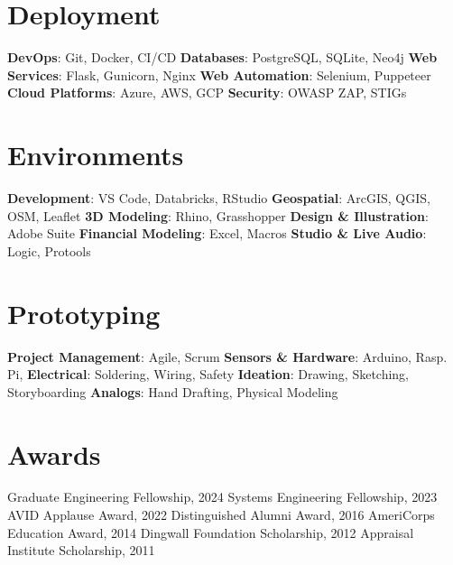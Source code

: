 \documentclass{article}
\begin{document}
\begin{bgbox}[
        height = \paperheight,
        width = 0.3\textwidth,
        colback = gray
    ]
{            \section*{Deployment}
                \textbf{DevOps}: Git, Docker, CI/CD \newline
                \textbf{Databases}: PostgreSQL, SQLite, Neo4j\newline
                \textbf{Web Services}: Flask, Gunicorn, Nginx\newline
                \textbf{Web Automation}: Selenium, Puppeteer\newline
                \textbf{Cloud Platforms}: Azure, AWS, GCP\newline
                \textbf{Security}: OWASP ZAP, STIGs
            \section*{Environments}
                \textbf{Development}: VS Code, Databricks, RStudio\newline
                \textbf{Geospatial}: ArcGIS, QGIS, OSM, Leaflet\newline
                \textbf{3D Modeling}: Rhino, Grasshopper\newline
                \textbf{Design \& Illustration}: Adobe Suite\newline
                \textbf{Financial Modeling}: Excel, Macros\newline
                \textbf{Studio \& Live Audio}: Logic, Protools
            \section*{Prototyping}
                \textbf{Project Management}: Agile, Scrum\newline
                \textbf{Sensors \& Hardware}: Arduino, Rasp. Pi,\newline
                \textbf{Electrical}: Soldering, Wiring, Safety\newline
                \textbf{Ideation}: Drawing, Sketching, Storyboarding\newline
                \textbf{Analogs}: Hand Drafting, Physical Modeling
            \section*{Awards}
                Graduate Engineering Fellowship, 2024\newline
                Systems Engineering Fellowship, 2023\newline
                AVID Applause Award, 2022\newline
                Distinguished Alumni Award, 2016\newline
                AmeriCorps Education Award, 2014\newline
                Dingwall Foundation Scholarship, 2012\newline
                Appraisal Institute Scholarship, 2011
        }
    \end{bgbox}
\end{document}
